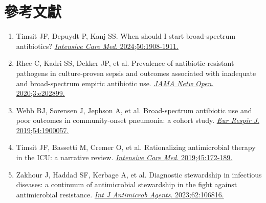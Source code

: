 \documentclass[12pt,a4paper]{article}
\begin{document}
\section{參考文獻}

\begin{enumerate}
    \item Timsit JF, Depuydt P, Kanj SS. When should I start broad-spectrum antibiotics? \href{https://doi.org/10.1007/s00134-024-07654-7}{\textit{Intensive Care Med}. 2024;50:1908-1911.}

    \item Rhee C, Kadri SS, Dekker JP, et al. Prevalence of antibiotic-resistant pathogens in culture-proven sepsis and outcomes associated with inadequate and broad-spectrum empiric antibiotic use. \href{https://doi.org/10.1001/jamanetworkopen.2020.2899}{\textit{JAMA Netw Open}. 2020;3:e202899.}

    \item Webb BJ, Sorensen J, Jephson A, et al. Broad-spectrum antibiotic use and poor outcomes in community-onset pneumonia: a cohort study. \href{https://doi.org/10.1183/13993003.00057-2019}{\textit{Eur Respir J}. 2019;54:1900057.}

    \item Timsit JF, Bassetti M, Cremer O, et al. Rationalizing antimicrobial therapy in the ICU: a narrative review. \href{https://doi.org/10.1007/s00134-018-5382-9}{\textit{Intensive Care Med}. 2019;45:172-189.}

    \item Zakhour J, Haddad SF, Kerbage A, et al. Diagnostic stewardship in infectious diseases: a continuum of antimicrobial stewardship in the fight against antimicrobial resistance. \href{https://doi.org/10.1016/j.ijantimicag.2023.106816}{\textit{Int J Antimicrob Agents}. 2023;62:106816.}
\end{enumerate}
\end{document}
